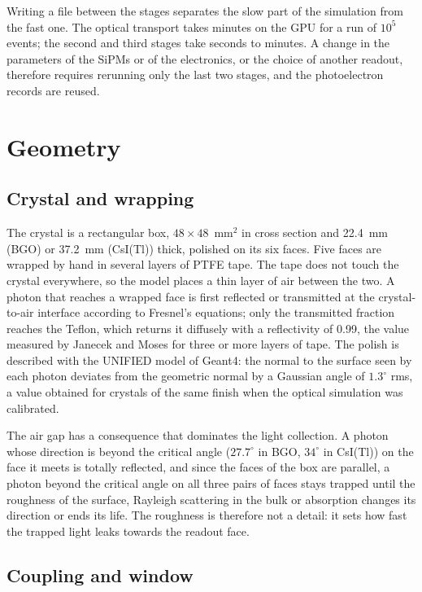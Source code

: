 \documentclass[11pt]{article}
\newcommand{\csitl}{CsI(Tl)\xspace}
\begin{document}
Writing a file between the stages separates the slow part of the
simulation from the fast one. The optical transport takes minutes on the GPU
for a run of $10^5$ events; the second and third stages take seconds to
minutes. A change in the parameters of the SiPMs or of the electronics, or
the choice of another readout, therefore requires rerunning only the last
two stages, and the photoelectron records are reused.

\section{Geometry}
\label{sec:geometry}

\subsection{Crystal and wrapping}

The crystal is a rectangular box, $48 \times 48$~mm$^2$ in cross section and
22.4~mm (BGO) or 37.2~mm (\csitl) thick, polished on its six faces. Five faces
are wrapped by hand in several layers of PTFE tape. The tape does not touch
the crystal everywhere, so the model places a thin layer of air between the
two. A photon that reaches a wrapped face is first reflected or transmitted at
the crystal-to-air interface according to Fresnel's equations; only the
transmitted fraction reaches the Teflon, which returns it diffusely with a
reflectivity of 0.99, the value measured by Janecek and Moses for three or
more layers of tape. The polish is described with the UNIFIED model of
Geant4: the normal to the surface seen by each photon deviates from the
geometric normal by a Gaussian angle of $1.3^\circ$ rms, a value obtained for
crystals of the same finish when the optical simulation was calibrated.

The air gap has a consequence that dominates the light collection. A photon
whose direction is beyond the critical angle ($27.7^\circ$ in BGO,
$34^\circ$ in \csitl) on the face it meets is totally reflected, and since
the faces of the box are parallel, a photon beyond the critical angle on all
three pairs of faces stays trapped until the roughness of the surface,
Rayleigh scattering in the bulk or absorption changes its direction or ends
its life. The roughness is therefore not a detail: it sets how fast the
trapped light leaks towards the readout face.

\subsection{Coupling and window}
\end{document}
